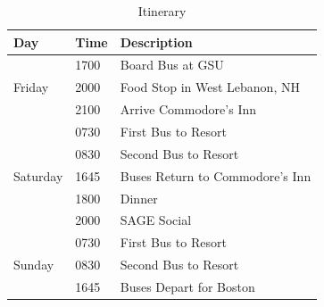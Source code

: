\begin{table}[h]
  \def\taw{0.14}
  \small
  \centering
  \caption{Itinerary}
  \label{tab-itinerary}
  \begin{tabular}{lll}
    \toprule
    Day & Time & Description\\
    \midrule
    \multirow{3}{*}{
      \begin{minipage}{\taw\columnwidth}
        Friday
      \end{minipage}}
    & 1700 & Board Bus at GSU\\
    & 2000 & Food Stop in West Lebanon, NH \\
    & 2100 & Arrive Commodore's Inn \\
    \midrule \multirow{5}{*}{
      \begin{minipage}{\taw\columnwidth}
        Saturday
        \end{minipage}}
    & 0730 & First Bus to Resort \\
    & 0830 & Second Bus to Resort \\
    & 1645 & Buses Return to Commodore's Inn \\
    & 1800 & Dinner \\
    & 2000 & SAGE Social \\
    \midrule \multirow{3}{*}{
      \begin{minipage}{\taw\columnwidth}
        Sunday
    \end{minipage}}
    & 0730 & First Bus to Resort \\
    & 0830 & Second Bus to Resort \\
    & 1645 & Buses Depart for Boston \\
    \bottomrule
  \end{tabular}
\end{table}

